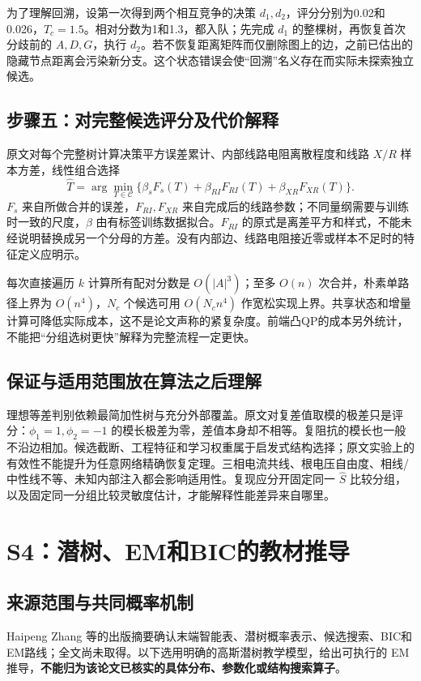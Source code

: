 为了理解回溯，设第一次得到两个相互竞争的决策 $d_1,d_2$，评分分别为0.02和0.026，$T_c=1.5$。相对分数为1和1.3，都入队；先完成 $d_1$ 的整棵树，再恢复首次分歧前的 $A,D,G$，执行 $d_2$。若不恢复距离矩阵而仅删除图上的边，之前已估出的隐藏节点距离会污染新分支。这个状态错误会使“回溯”名义存在而实际未探索独立候选。

\subsection{步骤五：对完整候选评分及代价解释}
原文对每个完整树计算决策平方误差累计、内部线路电阻离散程度和线路 $X/R$ 样本方差，线性组合选择
\begin{equation}
 \widehat T=\arg\min_{T\in\mathcal C}
 \{\beta_sF_s(T)+\beta_{RI}F_{RI}(T)+\beta_{XR}F_{XR}(T)\}.
\end{equation}
$F_s$ 来自所做合并的误差，$F_{RI},F_{XR}$ 来自完成后的线路参数；不同量纲需要与训练时一致的尺度，$\beta$ 由有标签训练数据拟合。$F_{RI}$ 的原式是离差平方和样式，不能未经说明替换成另一个分母的方差。没有内部边、线路电阻接近零或样本不足时的特征定义应明示。

每次直接遍历 $k$ 计算所有配对分数是 $O(|A|^3)$；至多 $O(n)$ 次合并，朴素单路径上界为 $O(n^4)$，$N_c$ 个候选可用 $O(N_cn^4)$ 作宽松实现上界。共享状态和增量计算可降低实际成本，这不是论文声称的紧复杂度。前端凸QP的成本另外统计，不能把“分组选树更快”解释为完整流程一定更快。

\subsection{保证与适用范围放在算法之后理解}
理想等差判别依赖最简加性树与充分外部覆盖。原文对复差值取模的极差只是评分：$\phi_1=1,\phi_2=-1$ 的模长极差为零，差值本身却不相等。复阻抗的模长也一般不沿边相加。候选截断、工程特征和学习权重属于启发式结构选择；原文实验上的有效性不能提升为任意网络精确恢复定理。三相电流共线、根电压自由度、相线/中性线不等、未知内部注入都会影响适用性。复现应分开固定同一 $\widehat S$ 比较分组，以及固定同一分组比较灵敏度估计，才能解释性能差异来自哪里。

\section{S4：潜树、EM和BIC的教材推导}
\subsection{来源范围与共同概率机制}
Haipeng Zhang 等\citep{S4}的出版摘要确认末端智能表、潜树概率表示、候选搜索、BIC和EM路线；全文尚未取得。以下选用明确的高斯潜树教学模型，给出可执行的 EM 推导，\textbf{不能归为该论文已核实的具体分布、参数化或结构搜索算子}。


